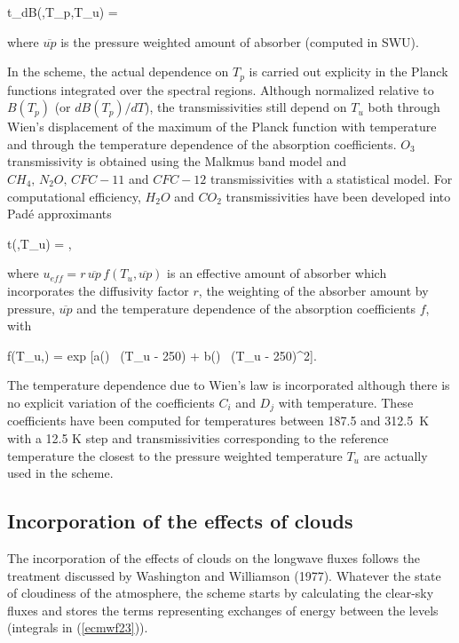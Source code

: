 \medskip
\be
t_{dB}(,T_p,T_u) = 
\label{ecmwf26b}
\ee
\medskip

\noindent where $\overline{up}$ is the pressure weighted amount of absorber (computed in SWU).


In the scheme, the actual dependence on $T_p$ is carried out explicity in the Planck functions integrated over the spectral regions. Although normalized relative to $B(T_p)$ (or $dB(T_p)/dT$), the transmissivities still depend on $T_u$ both through Wien's displacement of the maximum of the Planck function with temperature and through the temperature dependence of the absorption coefficients.
$O_3$ transmissivity is obtained using the Malkmus band model and $CH_4,\,N_2O,\,CFC-11$ and $CFC-12$ transmissivities with a statistical model.
For computational efficiency, $H_2O$ and $CO_2$ transmissivities have been developed into Pad\'e approximants


\medskip
\be
t(,T_u) = ,
\label{ecmwf27}
\ee
\medskip

\noindent where $u_{eff} = r \, \overline{up} \, f(T_u,\overline{up})$ is an effective amount of absorber which incorporates the diffusivity factor $r$, the weighting of the absorber amount by pressure, $\overline{up}$ and the temperature dependence of the absorption coefficients $f$, with

\medskip
\be
f(T_u,) = exp [a() \, (T_u - 250) + b() \, (T_u - 250)^2].
\label{ecmwf28}
\ee
\medskip

The temperature dependence due to Wien's law is incorporated although there is no explicit variation of the coefficients $C_i$ and $D_j$ with temperature. These coefficients have been computed for temperatures between 187.5 and 312.5~K with a 12.5 K step and transmissivities corresponding to the reference temperature the closest to the pressure weighted temperature $T_u$ are actually used in the scheme.

%
\subsection{Incorporation of the effects of clouds}
%

The incorporation of the effects of clouds on the longwave fluxes follows the treatment discussed by Washington and Williamson (1977). Whatever the state of cloudiness of the atmosphere, the scheme starts by calculating the clear-sky fluxes and stores the terms representing exchanges of energy between the levels (integrals in (\ref{ecmwf23})).

